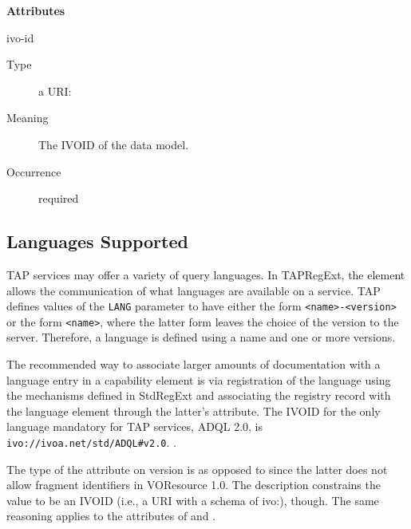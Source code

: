 \documentclass{ivoa}
\begin{document}
\vspace{0.5ex}\noindent\textbf{ Attributes}

\begingroup\small\begin{bigdescription}
\item[ivo-id]
\begin{description}
\item[Type] a URI: 
\item[Meaning] 
            The IVOID of the data model.
            
\item[Occurrence] required
\end{description}


\end{bigdescription}\endgroup

\endgroup

\subsection{Languages Supported}

\label{langs}

TAP services may offer a variety of query languages.  In TAPRegExt, the
 element allows the communication of what languages are
available on a service.  TAP defines values of the \texttt{LANG} parameter
to have either the form \texttt{<name>-<version>} or the form
\texttt{<name>}, where the latter form leaves the choice of the
version to the server.  Therefore, a language is defined using a name and one
or more versions.

The recommended way to associate larger amounts of documentation with a
language entry in a capability element is via registration of the language
using the mechanisms defined in StdRegExt \citep{std:STDREGEXT} and associating
the registry record with the language element through the latter's 
attribute.  The IVOID for the only language mandatory for TAP services,
ADQL 2.0, is 
\nolinkurl{ivo://ivoa.net/std/ADQL#v2.0}.
.

The type of the  attribute on version is 
 as opposed to  since
the latter does not allow fragment identifiers in VOResource 1.0. 
The description constrains the value to be an
IVOID (i.e., a URI with a schema of ivo:), though.  
The same reasoning applies to the 
attributes of  and .
\end{document}
